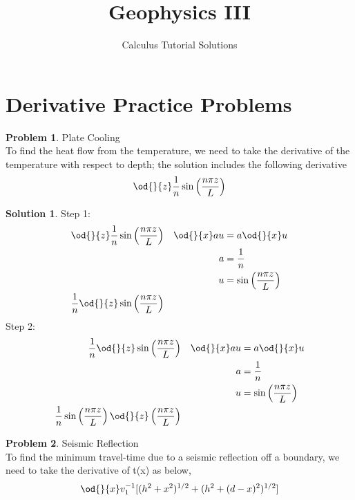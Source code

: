 \documentclass[final,a4paper,12pt]{article}
\title{Geophysics III}
\author{Calculus Tutorial Solutions}
\theoremstyle{definition}
\newtheorem{problem}{Problem}[section]
\newtheorem{solution}{Solution}[section]
\begin{document}
\maketitle

\section{Derivative Practice Problems}

\begin{problem}
    Plate Cooling \\
    To find the heat flow from the temperature, we need to take the derivative
    of the temperature with respect to depth; the solution includes the
    following derivative
    \begin{equation*}
        \od{}{z} \frac{1}{n} \sin \left( \frac{n \pi z}{L} \right)
    \end{equation*}
\end{problem}

\begin{solution}
    Step 1:
    \begin{align*}
        \od{}{z} \frac{1}{n} \sin \left( \frac{n \pi z}{L} \right) 
        && \od{}{x} a u &= a \od{}{x} u \\
        && a &= \frac{1}{n} \\ 
        && u &= \sin \left( \frac{n \pi z}{L} \right) \\
        \frac{1}{n} \od{}{z} \sin \left( \frac{n \pi z}{L} \right)
    \end{align*}
    Step 2:
    \begin{align*}
        \frac{1}{n} \od{}{z} \sin \left( \frac{n \pi z}{L} \right)
        && \od{}{x} a u &= a \od{}{x} u \\
        && a &= \frac{1}{n} \\ 
        && u &= \sin \left( \frac{n \pi z}{L} \right) \\
        \frac{1}{n} \sin \left( \frac{n \pi z}{L} \right) \od{}{z} \left( \frac{n \pi z}{L} \right)
    \end{align*}
\end{solution}

\begin{problem}
    Seismic Reflection \\
    To find the minimum travel-time due to a seismic reflection off a boundary,
    we need to take the derivative of t(x) as below,
    \begin{equation*}
        \od{}{x} v_1^{-1} [ (h^2 + x^2)^{1/2} + (h^2 + (d - x)^2)^{1/2}]
    \end{equation*}
\end{problem}
\end{document}
